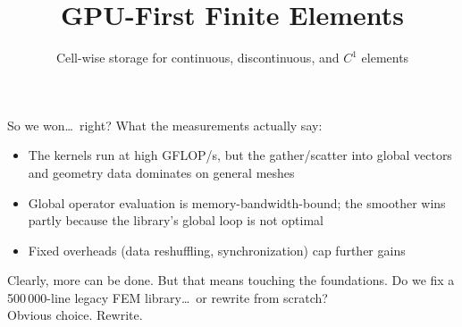 \documentclass{beamer}
\begin{document}
\begin{frame}{So we won\dots\ right?}
    What the measurements actually say:
    \begin{itemize}
        \item The kernels run at high GFLOP/s, but the \alert{gather/scatter} into global vectors and geometry data dominates on
              general meshes
        \item Global operator evaluation is \alert{memory-bandwidth-bound}; the smoother wins partly because the library's global
              loop is not optimal
        \item Fixed overheads (data reshuffling, synchronization) cap further gains
    \end{itemize}
    \vfill
    \pause
    \begin{alertblock}{Clearly, more can be done. But that means touching the foundations.}
        \centering
        Do we fix a 500\,000-line legacy FEM library\dots\ or rewrite from scratch?
        \\[0.5em]

        {\large Obvious choice. \pause\alert{Rewrite.}}
    \end{alertblock}
\end{frame}


{
\title{GPU-First Finite Elements}
\subtitle{Cell-wise storage for continuous, discontinuous, and $C^1$ elements}
\begin{frame}
    \titlepage
\end{frame}
}
\end{document}
